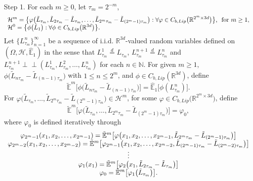 \documentclass[a4paper,oneside,10pt]{article}%
\numberwithin{equation}{section}
\begin{document}
Step 1. For each $m\geq0$, let $\tau_{m}=2^{-m}$,%
\[%
\begin{array}
[c]{l}%
\displaystyle \mathcal{H}^{m}=\big \{ \varphi \big(\tilde{L}_{\tau_{m}}%
,\tilde{L}_{2\tau_{m}}-\tilde{L}_{\tau_{m}},\ldots,\tilde{L}_{2^{m}\tau_{m}%
}-\tilde{L}_{(2^{m}-1)\tau_{m}}\big):\forall \varphi \in C_{b,Lip}%
\big(\mathbb{R}^{2^{m}\times3d}\big)\big \} \text{, \ for }m\geq1,\\
\displaystyle \mathcal{H}^{0}=\big \{ \phi \big(\tilde{L}_{1}\big):\forall
\phi \in C_{b,Lip}\big(\mathbb{R}^{3d}\big)\big \}.
\end{array}
\]
Let $\{L_{\tau_{m}}^{n}\}_{n=1}^{\infty}$ be a sequence of i.i.d.
$\mathbb{R}^{3d}$-valued random variables defined on $(\Omega,\mathcal{H}%
,\mathbb{\hat{E}}_{1})$ in the sense that $L_{\tau_{m}}^{1}\overset{d}%
{=}L_{\tau_{m}}$, $L_{\tau_{m}}^{n+1}\overset{d}{=}L_{\tau_{m}}^{n}$ and
$L_{\tau_{m}}^{n+1}\perp \! \! \! \perp(L_{\tau_{m}}^{1},L_{\tau_{m}}%
^{2},\ldots,L_{\tau_{m}}^{n})$ for each $n\in \mathbb{N}$. For given $m\geq1$,
$\phi \big(\tilde{L}_{n\tau_{m}}-\tilde{L}_{(n-1)\tau_{m}}\big)$ with $1\leq
n\leq2^{m}$, and $\phi \in C_{b,Lip}(\mathbb{R}^{3d})$, define
\[
\mathbb{\tilde{E}}^{m}\big[\phi \big(\tilde{L}_{n\tau_{m}}-\tilde{L}%
_{(n-1)\tau_{m}}\big)\big]=\mathbb{\hat{E}}_{1}\big[\phi(L_{\tau_{m}}%
^{n})\big].
\]
For $\varphi \big(\tilde{L}_{\tau_{m}},\ldots,\tilde{L}_{2^{m}\tau_{m}}%
-\tilde{L}_{(2^{m}-1)\tau_{m}}\big)\in \mathcal{H}^{m}$, for some $\varphi \in
C_{b,Lip}\big(\mathbb{R}^{2^{m}\times3d}\big)$, define
\[
\mathbb{\tilde{E}}^{m}\big[\varphi \big(\tilde{L}_{\tau_{m}},\ldots,\tilde
{L}_{2^{m}\tau_{m}}-\tilde{L}_{(2^{m}-1)\tau_{m}}\big)\big]=\varphi_{0},
\]
where $\varphi_{0}$ is defined iteratively through
\[%
\begin{array}
[c]{c}%
\displaystyle \varphi_{2^{m}-1}(x_{1},x_{2},\ldots,x_{2^{m}-1})=\mathbb{\tilde
{E}}^{m}\big[\varphi \big(x_{1},x_{2},\ldots,x_{2^{m}-1},\tilde{L}_{2^{m}%
\tau_{m}}-\tilde{L}_{(2^{m}-1)\tau_{m}}\big)\big]\\
\displaystyle \varphi_{2^{m}-2}(x_{1},x_{2},\ldots,x_{2^{m}-2})=\mathbb{\tilde
{E}}^{m}\big[\varphi_{2^{m}-1}\big(x_{1},x_{2},\ldots,x_{2^{m}-2},\tilde
{L}_{(2^{m}-1)\tau_{m}}-\tilde{L}_{(2^{m}-2)\tau_{m}}\big)\big]\\
\displaystyle \vdots \\
\displaystyle \varphi_{1}(x_{1})=\mathbb{\tilde{E}}^{m}\big[\varphi
_{2}\big(x_{1},\tilde{L}_{2\tau_{m}}-\tilde{L}_{\tau_{m}}\big)\big]\\
\displaystyle \varphi_{0}=\mathbb{\tilde{E}}^{m}\big[\varphi_{1}\big(\tilde
{L}_{\tau_{m}}\big)\big].
\end{array}
\]
\end{document}

